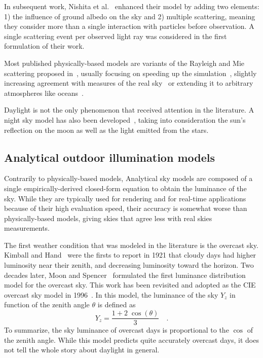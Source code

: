 In subsequent work, Nishita et al.~\cite{nishita1996display} enhanced their model by adding two elements: 1) the influence of ground albedo on the sky and 2) multiple scattering, meaning they consider more than a single interaction with particles before observation. A single scattering event per observed light ray was considered in the first formulation of their work.

Most published physically-based models are variants of the Rayleigh and Mie scattering proposed in~\cite{nishita1993display}, usually focusing on speeding up the simulation~\cite{oneal2005accurate}, slightly increasing agreement with measures of the real sky~\cite{haber2005physically,bruneton2008precomputed} or extending it to arbitrary atmospheres like oceans~\cite{elek2010real}.

Daylight is not the only phenomenon that received attention in the literature. A night sky model has also been developed~\cite{jensen2001nightskymodel}, taking into consideration the sun's reflection on the moon as well as the light emitted from the stars.

\subsection{Analytical outdoor illumination models}

Contrarily to physically-based models, Analytical sky models are composed of a single empirically-derived closed-form equation to obtain the luminance of the sky. While they are typically used for rendering and for real-time applications because of their high evaluation speed, their accuracy is somewhat worse than physically-based models, giving skies that agree less with real skies measurements.

The first weather condition that was modeled in the literature is the overcast sky. Kimball and Hand~\cite{kimball1921sky} were the firsts to report in 1921 that cloudy days had higher luminosity near their zenith, and decreasing luminosity toward the horizon. Two decades later, Moon and Spencer~\cite{moon1942illumination} formulated the first luminance distribution model for the overcast sky. This work has been revisited and adopted as the CIE overcast sky model in 1996~\cite{cie1996s}. In this model, the luminance of the sky $Y_z$ in function of the zenith angle $\theta$ is defined as
\begin{equation}
Y_z = \frac{1 + 2 \; \cos\left( \theta \right)}{3} \quad.
\end{equation}
To summarize, the sky luminance of overcast days is proportional to the $\cos$ of the zenith angle. While this model predicts quite accurately overcast days, it does not tell the whole story about daylight in general.

